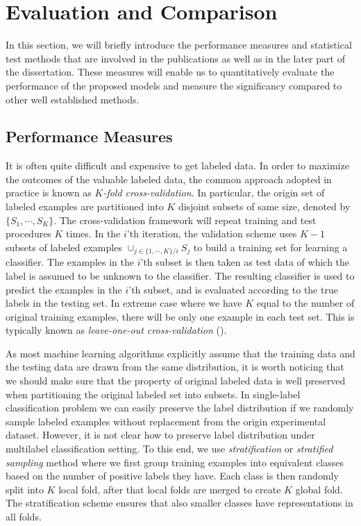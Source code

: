 {%




%
%
%
\section{Evaluation and Comparison}\label{sc_statistics}

In this section, we will briefly introduce the performance measures and statistical test methods that are involved in the publications as well as in the later part of the dissertation.
These measures will enable us to quantitatively evaluate the performance of the proposed models and measure the significancy compared to other well established methods.

%
%
\subsection{Performance Measures}

It is often quite difficult and expensive to get labeled data. 
In order to maximize the outcomes of the valuable labeled data, the common approach adopted in practice is known as \textit{$K$-fold cross-validation}.
In particular, the origin set of labeled examples are partitioned into $K$ disjoint subsets of same size, denoted by $\{S_1,\cdots,S_K\}$.
The cross-validation framework will repeat training and test procedures $K$ times.
In the $i$'th iteration, the validation scheme uses $K-1$ subsets of labeled examples $\cup_{j\in\{1,\cdots,K\}/i}S_j$ to build a training set for learning a classifier.
The examples in the $i$'th subset is then taken as test data of which the label is assumed to be unknown to the classifier.
The resulting classifier is used to predict the examples in the $i$'th subset, and is evaluated according to the true labels in the testing set.
In extreme case where we have $K$ equal to the number of original training examples, there will be only one example in each test set.
This is typically known as \textit{leave-one-out cross-validation} (\loo).

As most machine learning algorithms explicitly assume that the training data and the testing data are drawn from the same distribution,
it is worth noticing that we should make sure that the property of original labeled data is well preserved when partitioning the original labeled set into subsets.
In single-label classification problem we can easily preserve the label distribution if we randomly sample labeled examples without replacement from the origin experimental dataset.
However, it is not clear how to preserve label distribution under multilabel classification setting.
To this end, we use \textit{stratification} or \textit{stratified sampling} method where we first group training examples into equivalent classes based on the number of positive labels they have. 
Each class is then randomly split into $K$ local fold, after that local folds are merged to create $K$ global fold.
The stratification scheme ensures that also smaller classes have representations in all folds. 

}
